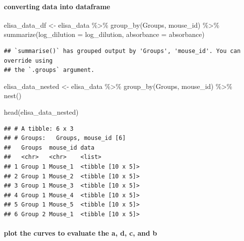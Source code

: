 \documentclass[
]{book}
\newenvironment{Shaded}{\begin{snugshade}}{\end{snugshade}}
\newcommand{\AttributeTok}[1]{\textcolor[rgb]{0.77,0.63,0.00}{#1}}
\newcommand{\FunctionTok}[1]{\textcolor[rgb]{0.00,0.00,0.00}{#1}}
\newcommand{\NormalTok}[1]{#1}
\newcommand{\OtherTok}[1]{\textcolor[rgb]{0.56,0.35,0.01}{#1}}
\newcommand{\SpecialCharTok}[1]{\textcolor[rgb]{0.00,0.00,0.00}{#1}}
\begin{document}
\hypertarget{converting-data-into-dataframe}{%
\paragraph{converting data into dataframe}\label{converting-data-into-dataframe}}

\begin{Shaded}
\begin{Highlighting}[]
\NormalTok{elisa\_data\_df }\OtherTok{\textless{}{-}}\NormalTok{ elisa\_data }\SpecialCharTok{\%\textgreater{}\%} 
  \FunctionTok{group\_by}\NormalTok{(Groups, mouse\_id) }\SpecialCharTok{\%\textgreater{}\%} 
  \FunctionTok{summarize}\NormalTok{(}\AttributeTok{log\_dilution =}\NormalTok{ log\_dilution, }
            \AttributeTok{absorbance =}\NormalTok{ absorbance)}
\end{Highlighting}
\end{Shaded}

\begin{verbatim}
## `summarise()` has grouped output by 'Groups', 'mouse_id'. You can override using
## the `.groups` argument.
\end{verbatim}

\begin{Shaded}
\begin{Highlighting}[]
\NormalTok{elisa\_data\_nested }\OtherTok{\textless{}{-}}\NormalTok{ elisa\_data }\SpecialCharTok{\%\textgreater{}\%}
  \FunctionTok{group\_by}\NormalTok{(Groups, mouse\_id) }\SpecialCharTok{\%\textgreater{}\%}
  \FunctionTok{nest}\NormalTok{()}

\FunctionTok{head}\NormalTok{(elisa\_data\_nested)}
\end{Highlighting}
\end{Shaded}

\begin{verbatim}
## # A tibble: 6 x 3
## # Groups:   Groups, mouse_id [6]
##   Groups  mouse_id data             
##   <chr>   <chr>    <list>           
## 1 Group 1 Mouse_1  <tibble [10 x 5]>
## 2 Group 1 Mouse_2  <tibble [10 x 5]>
## 3 Group 1 Mouse_3  <tibble [10 x 5]>
## 4 Group 1 Mouse_4  <tibble [10 x 5]>
## 5 Group 1 Mouse_5  <tibble [10 x 5]>
## 6 Group 2 Mouse_1  <tibble [10 x 5]>
\end{verbatim}

\hypertarget{plot-the-curves-to-evaluate-the-a-d-c-and-b}{%
\paragraph{plot the curves to evaluate the a, d, c, and b}\label{plot-the-curves-to-evaluate-the-a-d-c-and-b}}
\end{document}
